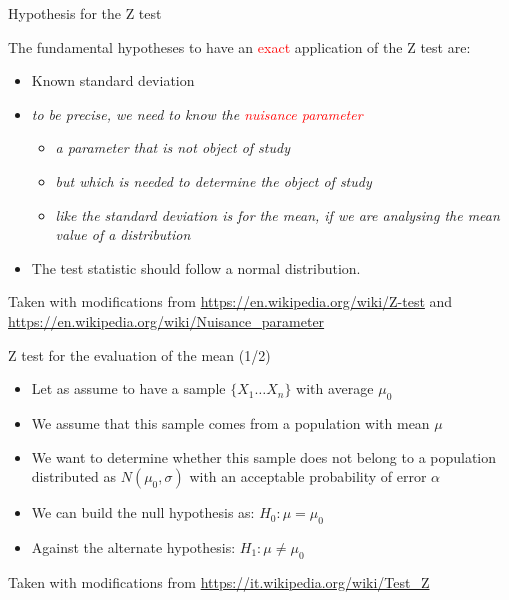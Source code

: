 \documentclass{beamer}
\begin{document}
\begin{frame}
{\centerline{Hypothesis for the Z test}}

The fundamental hypotheses to have an \textcolor{red}{exact} application of the Z test are:
\begin{itemize}
\item Known standard deviation
\item \textit{to be precise, we need to know the \textcolor{red}{nuisance parameter}}
\begin{itemize}
\item \textit{a parameter that is not object of study}
\item \textit{but which is needed to determine the object of study}
\item \textit{like the standard deviation is for the mean, if we are analysing the mean value of a distribution}
\end{itemize}

\item The test statistic should follow a normal distribution.
\end{itemize}

\begin{center}
\tiny{Taken with modifications from \url{https://en.wikipedia.org/wiki/Z-test} and \url{https://en.wikipedia.org/wiki/Nuisance_parameter}}
\end{center}


\end{frame}



\begin{frame}
{\centerline{Z test for the evaluation of the mean (1/2)}}

\begin{itemize}
\item Let as assume to have a sample $\{X_1 \ldots X_n\}$ with average $\mu_0$
\item We assume that this sample comes from a population with mean $\mu$
\item We want to determine whether this sample does not belong to a population distributed as $N(\mu_0,\sigma)$ with an acceptable probability of error $\alpha$
\item We can build the null hypothesis as:  $H_0: \mu = \mu_0 $
\item Against the alternate hypothesis: $ H_1: \mu \neq \mu_0 $
\end{itemize}

\begin{center}
\tiny{Taken with modifications from \url{https://it.wikipedia.org/wiki/Test_Z}}
\end{center}

\end{frame}
\end{document}
